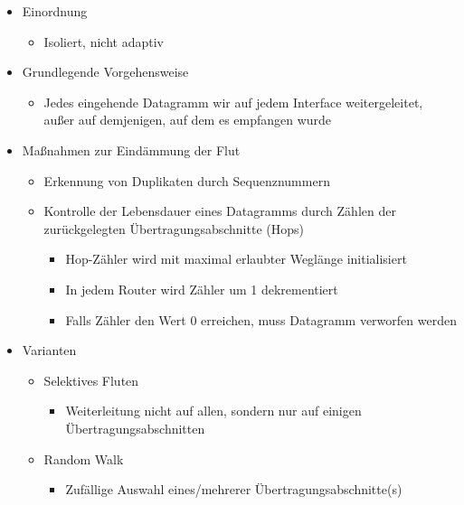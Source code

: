       \begin{itemize}
        \item Einordnung
          \begin{itemize}
            \item Isoliert, nicht adaptiv
          \end{itemize}
        \item Grundlegende Vorgehensweise
          \begin{itemize}
            \item Jedes eingehende Datagramm wir auf jedem Interface weitergeleitet, außer auf
              demjenigen, auf dem es empfangen wurde
          \end{itemize}
        \item Maßnahmen zur Eindämmung der Flut
          \begin{itemize}
            \item Erkennung von Duplikaten durch Sequenznummern
            \item Kontrolle der Lebensdauer eines Datagramms durch Zählen der zurückgelegten
              Übertragungsabschnitte (Hops)
              \begin{itemize}
                \item Hop-Zähler wird mit maximal erlaubter Weglänge initialisiert
                \item In jedem Router wird Zähler um 1 dekrementiert
                \item Falls Zähler den Wert 0 erreichen, muss Datagramm verworfen werden
              \end{itemize}
          \end{itemize}
        \item Varianten
          \begin{itemize}
            \item Selektives Fluten
              \begin{itemize}
                \item Weiterleitung nicht auf allen, sondern nur auf einigen Übertragungsabschnitten
              \end{itemize}
            \item Random Walk
              \begin{itemize}
                \item Zufällige Auswahl eines/mehrerer Übertragungsabschnitte(s)
              \end{itemize}
          \end{itemize}
      \end{itemize}
